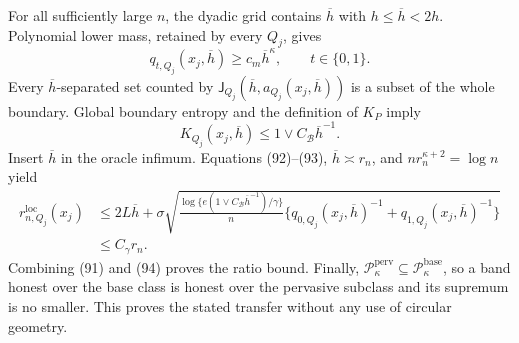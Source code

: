 For all sufficiently large \(n\), the dyadic grid contains
\(\overline h\) with \(h\le\overline h<2h\).  Polynomial lower mass,
retained by every \(Q_j\), gives
\[
 q_{t,Q_j}(x_j,\overline h)\ge c_m\overline h^\kappa,
 \qquad t\in\{0,1\}.
 \tag{92}
\]
Every \(\overline h\)-separated set counted by
\(\mathsf J_{Q_j}(\overline h,a_{Q_j}(x_j,\overline h))\) is a subset
of the whole boundary.  Global boundary entropy and the definition of
\(K_P\) imply
\[
 K_{Q_j}(x_j,\overline h)
 \le1\vee C_{\mathcal B}\overline h^{-1}.
 \tag{93}
\]
Insert \(\overline h\) in the oracle infimum.  Equations (92)--(93),
\(\overline h\asymp r_n\), and \(nr_n^{\kappa+2}=\log n\) yield
\[
 \begin{aligned}
 r_{n,Q_j}^{\mathrm{loc}}(x_j)
 &\le2L\overline h+
 \sigma\sqrt{\frac{\log\{e(1\vee C_{\mathcal B}\overline h^{-1})/
 \gamma\}}n
 \{q_{0,Q_j}(x_j,\overline h)^{-1}
   +q_{1,Q_j}(x_j,\overline h)^{-1}\}}\\
 &\le C_\gamma r_n.
 \end{aligned}
 \tag{94}
\]
Combining (91) and (94) proves the ratio bound.  Finally,
\(\mathcal P_{\kappa}^{\mathrm{perv}}\subseteq
\mathcal P_{\kappa}^{\mathrm{base}}\), so a band honest over the base
class is honest over the pervasive subclass and its supremum is no
smaller.  This proves the stated transfer without any use of circular
geometry.